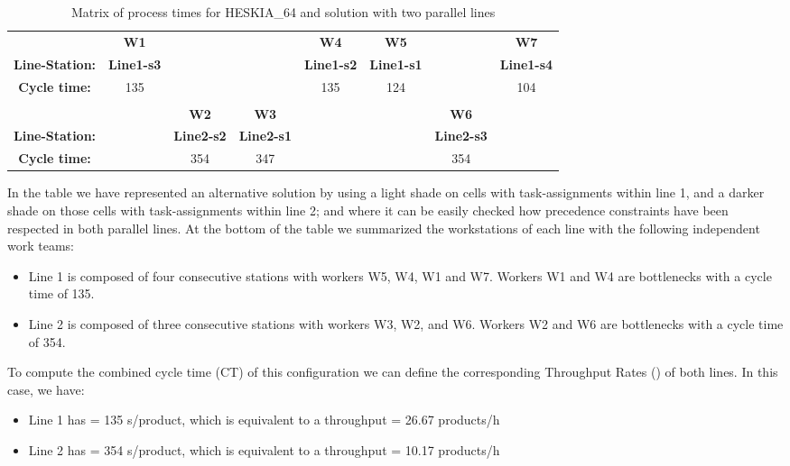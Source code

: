 \documentclass{singlecol-new}
\begin{document}
\begin{table}[!ht]
{\begin{tabular}{cccccccc}
    {\bf } &   {\bf W1} &     {\bf } &     {\bf } &   {\bf W4} &   {\bf W5} &     {\bf } &   {\bf W7} \\

{\bf Line-Station:} & {\bf Line1-s3} &     {\bf } &     {\bf } & {\bf Line1-s2} & {\bf Line1-s1} &     {\bf } & {\bf Line1-s4} \\
\hline
{\bf Cycle time:} &        135 &            &            &        135 &        124 &            &        104 \\

    {\bf } &     {\bf } &     {\bf } &     {\bf } &     {\bf } &     {\bf } &     {\bf } &     {\bf } \\

    {\bf } &     {\bf } &   {\bf W2} &   {\bf W3} &     {\bf } &     {\bf } &   {\bf W6} &     {\bf } \\

{\bf Line-Station:} &     {\bf } & {\bf Line2-s2} & {\bf Line2-s1} &     {\bf } &     {\bf } & {\bf Line2-s3} &     {\bf } \\
\hline
{\bf Cycle time:} &            &        354 &        347 &            &            &        354 &            \\
\hline
\end{tabular}
}
\caption{Matrix of process times for HESKIA\_64 and solution with two parallel lines}
\label{tab:heskia_64}
\end{table}

In the table we have represented an alternative solution by using a light shade on cells with task-assignments within line 1, and a darker shade on those cells with task-assignments within line 2; and where it can be easily checked how precedence constraints have been respected in both parallel lines. At the bottom of the table we summarized the workstations of each line with the following independent work teams:
\begin{itemize}
	\item Line 1 is composed of four consecutive stations with workers W5, W4, W1 and W7. Workers W1 and W4 are bottlenecks with a cycle time of 135.
	\item Line 2 is composed of three consecutive stations with workers W3, W2, and W6. Workers W2 and W6 are bottlenecks with a cycle time of 354.
\end{itemize}

To compute the combined cycle time (CT) of this configuration we can define the corresponding Throughput Rates () of both lines. In this case, we have: 
\begin{itemize}
	\item Line 1 has  = 135 s/product, which is equivalent to a throughput   = 26.67 products/h
	\item Line 2 has  = 354 s/product, which is equivalent to a throughput  = 10.17 products/h
\end{itemize}
\end{document}
